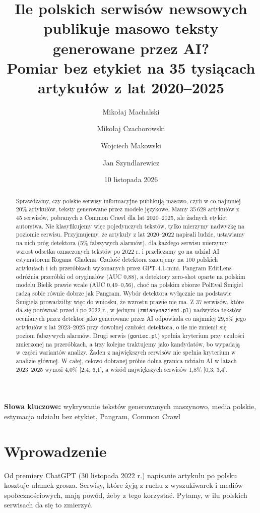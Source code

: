 \documentclass[11pt,a4paper]{article}
\title{Ile polskich serwisów newsowych publikuje masowo teksty generowane przez AI?\\
\large Pomiar bez etykiet na 35 tysiącach artykułów z lat 2020--2025}
\author{Mikołaj Machalski \and Mikołaj Czachorowski \and Wojciech Makowski \and Jan Szyndlarewicz}
\date{10 listopada 2026}
\newcommand{\dom}[1]{\texttt{#1}}
\begin{document}
\maketitle

\begin{abstract}
\noindent Sprawdzamy, czy polskie serwisy informacyjne publikują masowo, czyli w co najmniej 20\% artykułów, teksty generowane przez modele językowe. Mamy 35\,628 artykułów z 45 serwisów, pobranych z Common Crawl dla lat 2020--2025, ale żadnych etykiet autorstwa. Nie klasyfikujemy więc pojedynczych tekstów, tylko mierzymy nadwyżkę na poziomie serwisu. Przyjmujemy, że artykuły z lat 2020--2022 napisali ludzie, ustawiamy na nich próg detektora (5\% fałszywych alarmów), dla każdego serwisu mierzymy wzrost odsetka oznaczonych tekstów po 2022 r. i przeliczamy go na udział AI estymatorem Rogana--Gladena. Czułość detektora szacujemy na 100 polskich artykułach i ich przeróbkach wykonanych przez GPT-4.1-mini. Pangram EditLens odróżnia przeróbki od oryginałów (AUC 0,88), a detektory zero-shot oparte na polskim modelu Bielik prawie wcale (AUC 0,49--0,56), choć na polskim zbiorze PolEval Śmigiel radzą sobie równie dobrze jak Pangram. Wybór detektora wyłącznie na podstawie Śmigiela prowadziłby więc do wniosku, że wzrostu prawie nie ma. Z 37 serwisów, które da się porównać przed i po 2022 r., w jednym (\dom{zmianynaziemi.pl}) nadwyżka tekstów ocenianych przez detektor jako generowane przez AI odpowiada co najmniej 29,8\% jego artykułów z lat 2023--2025 przy dowolnej czułości detektora, o ile nie zmienił się poziom fałszywych alarmów. Drugi serwis (\dom{goniec.pl}) spełnia kryterium przy czułości zmierzonej na przeróbkach, a trzy kolejne traktujemy jako kandydatów, bo wypadają w części wariantów analizy. Żaden z największych serwisów nie spełnia kryterium w analizie głównej. W całej, celowo dobranej próbie dolna granica udziału AI w latach 2023--2025 wynosi 4,0\% [2,4; 6,1], a wśród największych serwisów 1,8\% [0,3; 3,4].
\end{abstract}

\medskip
\noindent\textbf{Słowa kluczowe:} wykrywanie tekstów generowanych maszynowo, media polskie, estymacja udziału bez etykiet, Pangram, Common Crawl

\section{Wprowadzenie}

Od premiery ChatGPT (30 listopada 2022 r.) napisanie artykułu po polsku kosztuje ułamek grosza. Serwisy, które żyją z ruchu z wyszukiwarek i mediów społecznościowych, mają powód, żeby z tego korzystać. Pytamy, w ilu polskich serwisach da się to zmierzyć.
\end{document}
